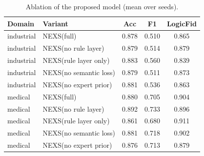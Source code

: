 \begin{table}[t]\centering
\caption{Ablation of the proposed model (mean over seeds).}
\label{tab:abl}
\begin{tabular}{llccc}
\toprule
Domain & Variant & Acc & F1 & LogicFid \\
\midrule
industrial & NEXS(full) & 0.878 & 0.510 & 0.865 \\
industrial & NEXS(no rule layer) & 0.879 & 0.514 & 0.879 \\
industrial & NEXS(rule layer only) & 0.883 & 0.560 & 0.839 \\
industrial & NEXS(no semantic loss) & 0.879 & 0.511 & 0.873 \\
industrial & NEXS(no expert prior) & 0.881 & 0.536 & 0.863 \\
\midrule
medical & NEXS(full) & 0.880 & 0.705 & 0.904 \\
medical & NEXS(no rule layer) & 0.892 & 0.733 & 0.896 \\
medical & NEXS(rule layer only) & 0.861 & 0.680 & 0.911 \\
medical & NEXS(no semantic loss) & 0.881 & 0.718 & 0.902 \\
medical & NEXS(no expert prior) & 0.876 & 0.713 & 0.879 \\
\bottomrule
\end{tabular}
\end{table}